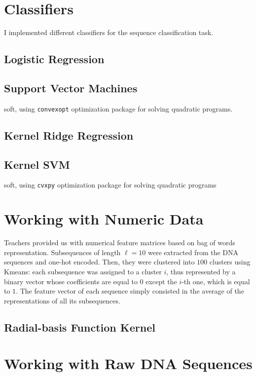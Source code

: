 \documentclass[final]{cvpr}
\begin{document}
	\section{Classifiers}
	
	I implemented different classifiers for the sequence classification task.
	
	\subsection{Logistic Regression}
	
	\subsection{Support Vector Machines} 
	
	soft, using \texttt{convexopt} optimization package for solving quadratic programs.
	
	\subsection{Kernel Ridge Regression}
	
	\subsection{Kernel SVM} 
	
	soft, using \texttt{cvxpy} optimization package for solving quadratic programs
	
	\section{Working with Numeric Data}
	
	Teachers provided us with numerical feature matrices based on bag of words representation. Subsequences of length $\ell = 10$ were extracted from the DNA sequences and one-hot encoded. Then, they were clustered into $100$ clusters using Kmeans: each subsequence was assigned to a cluster $i$, thus represented by a binary vector whose coefficients are equal to $0$ except the $i$-th one, which is equal to $1$. The feature vector of each sequence simply consisted in the average of the representations of all its subsequences.
	
	\subsection{Radial-basis Function Kernel}
	
	\section{Working with Raw DNA Sequences}
	
\end{document}
